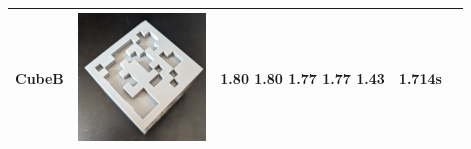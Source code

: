 \begin{table}[h!]
\begin{tabular}{|c|>{\centering\arraybackslash}m{3.5cm}|c|>{\centering\arraybackslash}m{3cm}|c|}
CubeB & \includegraphics[width=3.4cm,height=3.4cm,keepaspectratio]{img/CubeB.jpg} & 1.80 1.80 1.77 1.77 1.43 & 1.714s \\
\hline
\end{tabular}
\end{table}